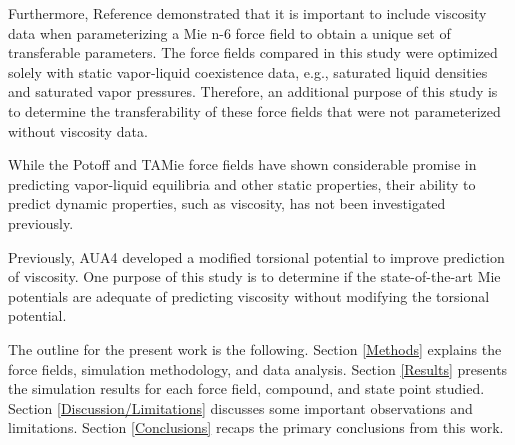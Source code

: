 \documentclass[preprint,review,12pt]{elsarticle}
\begin{document}
    Furthermore, Reference  demonstrated that it is important to include viscosity data when parameterizing a Mie n-6 force field to obtain a unique set of transferable parameters. The force fields compared in this study were optimized solely with static vapor-liquid coexistence data, e.g., saturated liquid densities and saturated vapor pressures. Therefore, an additional purpose of this study is to determine the transferability of these force fields that were not parameterized without viscosity data.
    
    While the Potoff and TAMie force fields have shown considerable promise in predicting vapor-liquid equilibria and other static properties, their ability to predict dynamic properties, such as viscosity, has not been investigated previously.
    
    Previously, AUA4 developed a modified torsional potential to improve prediction of viscosity. One purpose of this study is to determine if the state-of-the-art Mie potentials are adequate of predicting viscosity without modifying the torsional potential.
    
    The outline for the present work is the following. Section \ref{Methods} explains the force fields, simulation methodology, and data analysis. Section \ref{Results} presents the simulation results for each force field, compound, and state point studied. Section \ref{Discussion/Limitations} discusses some important observations and limitations. Section \ref{Conclusions} recaps the primary conclusions from this work.
    
	
	
\end{document}
